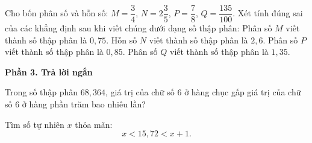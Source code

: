 \begin{ex} %
Cho bốn phân số và hỗn số: $M = \dfrac{3}{4}$, $N = 2\dfrac{3}{5}$, $P = \dfrac{7}{8}$, $Q = \dfrac{135}{100}$. Xét tính đúng sai của các khẳng định sau khi viết chúng dưới dạng số thập phân:
\choiceTF
{\True Phân số $M$ viết thành số thập phân là $0{,}75$.}
{\True Hỗn số $N$ viết thành số thập phân là $2{,}6$.}
{Phân số $P$ viết thành số thập phân là $0{,}85$.}
{\True Phân số $Q$ viết thành số thập phân là $1{,}35$.}
\end{ex}

\textbf{Phần 3. Trả lời ngắn}

\begin{ex} %
Trong số thập phân $68{,}364$, giá trị của chữ số $6$ ở hàng chục gấp giá trị của chữ số $6$ ở hàng phần trăm bao nhiêu lần?
\end{ex}

\begin{ex} %
Tìm số tự nhiên $x$ thỏa mãn:
\[
x < 15{,}72 < x + 1.
\]
\end{ex}

